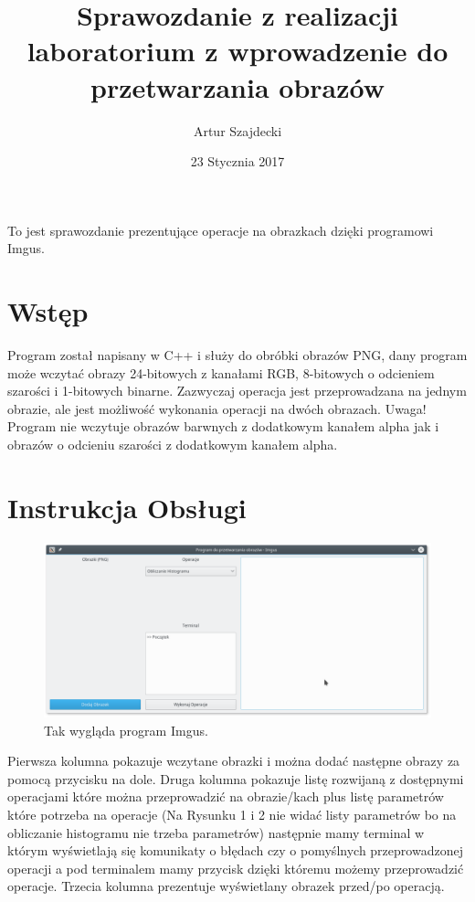 \documentclass{article}
\title{Sprawozdanie z realizacji laboratorium z wprowadzenie do przetwarzania obrazów }
\author{Artur Szajdecki}
\date{23 Stycznia 2017}
\begin{document}
\maketitle
To jest sprawozdanie prezentujące operacje na obrazkach dzięki programowi Imgus.

\FloatBarrier
\section{Wstęp}
Program został napisany w C++ i służy do obróbki obrazów PNG, dany program może wczytać obrazy 24-bitowych z kanałami RGB, 8-bitowych o odcieniem szarości i 1-bitowych binarne. Zazwyczaj operacja jest przeprowadzana na jednym obrazie, ale jest możliwość wykonania operacji na dwóch obrazach.
Uwaga! Program nie wczytuje obrazów barwnych z dodatkowym kanałem alpha jak i obrazów o odcieniu szarości z dodatkowym kanałem alpha.

\FloatBarrier
\section{Instrukcja Obsługi}
\begin{figure}[!htb]
\centering
\includegraphics[scale=0.4]{img/software.png} 
\caption{Tak wygląda program Imgus.}
\label{fig:verticalcell}
\end{figure}
Pierwsza kolumna pokazuje wczytane obrazki i można dodać następne obrazy za pomocą przycisku na dole. Druga kolumna pokazuje listę rozwijaną z dostępnymi operacjami które można przeprowadzić na obrazie/kach plus listę parametrów które potrzeba na operacje (Na Rysunku 1 i 2 nie widać listy parametrów bo na obliczanie histogramu nie trzeba parametrów) następnie mamy terminal w którym wyświetlają się komunikaty o błędach czy o pomyślnych przeprowadzonej operacji a pod terminalem mamy przycisk dzięki któremu możemy przeprowadzić operacje. Trzecia kolumna prezentuje wyświetlany obrazek przed/po operacją.\\
\end{document}
